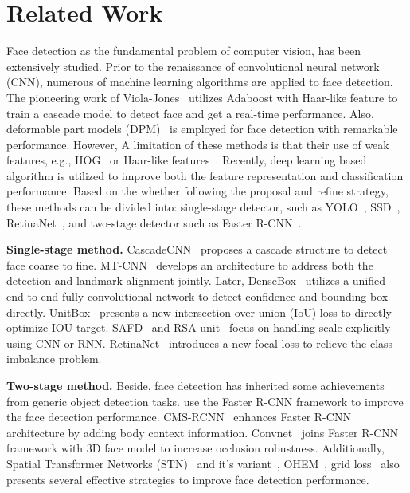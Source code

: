 \documentclass[10pt,twocolumn,letterpaper]{article}
\begin{document}
\section{Related Work}\label{sec:relatedwork}
Face detection as the fundamental problem of computer vision, has been extensively studied. Prior to the renaissance of convolutional neural network (CNN), numerous of machine learning algorithms are applied to face detection. The pioneering work of Viola-Jones~\cite{viola2004robust} utilizes Adaboost with Haar-like feature to train a cascade model to detect face and get a real-time performance. Also, deformable part models (DPM)~\cite{felzenszwalb2008discriminatively} is employed for face detection with remarkable performance. However, A limitation of these methods is that their use of weak features, e.g., HOG~\cite{dalal2005histograms} or Haar-like features~\cite{viola2001rapid}. Recently, deep learning based algorithm is utilized to improve both the feature representation and classification performance. 
Based on the whether following the proposal and refine strategy, these methods can be divided into: single-stage detector, such as YOLO~\cite{redmon2016you}, SSD~\cite{liu2016ssd}, RetinaNet~\cite{lin2017focal}, and two-stage detector such as Faster R-CNN~\cite{ren2015faster}.

\textbf{Single-stage method.} CascadeCNN~\cite{li2015convolutional} proposes a cascade structure to detect face coarse to fine. MT-CNN~\cite{zhang2016joint} develops an architecture to address both the detection and landmark alignment jointly. Later, DenseBox~\cite{huang2015densebox} utilizes a unified end-to-end fully convolutional network to detect confidence and bounding box directly. UnitBox~\cite{yu2016unitbox} presents a new intersection-over-union (IoU) loss to directly optimize IOU target. SAFD~\cite{hao2017scale} and RSA unit~\cite{liu2017recurrent} focus on handling scale explicitly using CNN or RNN. RetinaNet~\cite{lin2017focal} introduces a new focal loss to relieve the class imbalance problem.  

\textbf{Two-stage method.} Beside, face detection has inherited some achievements from generic object detection tasks. \cite{jiang2017face} use the Faster R-CNN framework to improve the face detection performance. CMS-RCNN~\cite{zhu2017cms} enhances Faster R-CNN architecture by adding body context information. Convnet~\cite{li2016face} joins Faster R-CNN framework with 3D face model to increase occlusion robustness. Additionally, Spatial Transformer Networks (STN)~\cite{jaderberg2015spatial} and it's variant~\cite{chen2016supervised}, OHEM~\cite{shrivastava2016training}, grid loss~\cite{opitz2016grid} also presents several effective strategies to improve face detection performance.  
 
\end{document}
